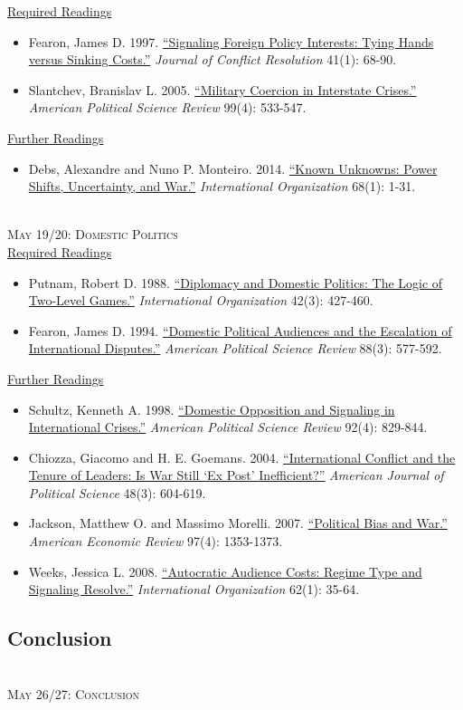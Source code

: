 \documentclass[11pt]{article}
\begin{document}
\noindent \underline{Required Readings}

\begin{itemize}
\item Fearon, James D. 1997. \href{http://jcr.sagepub.com/content/41/1/68.short}{``Signaling Foreign Policy Interests: Tying Hands versus Sinking Costs.''} \textit{Journal of Conflict Resolution} 41(1): 68-90.
\item Slantchev, Branislav L. 2005. \href{http://www.jstor.org/stable/30038963}{``Military Coercion in Interstate Crises.''} \textit{American Political Science Review} 99(4): 533-547.
\end{itemize}

\noindent \underline{Further Readings}

\begin{itemize}
\item Debs, Alexandre and Nuno P. Monteiro. 2014. \href{http://dx.doi.org/10.1017/S0020818313000192}{``Known Unknowns: Power Shifts, Uncertainty, and War.''} \textit{International Organization} 68(1): 1-31.
\end{itemize}

~\\
\noindent \textsc{May 19/20: Domestic Politics} \\

\noindent \underline{Required Readings}

\begin{itemize}
\item Putnam, Robert D. 1988. \href{http://www.jstor.org/stable/2706785}{``Diplomacy and Domestic Politics: The Logic of Two-Level Games.''} \textit{International Organization} 42(3): 427-460.
\item Fearon, James D. 1994. \href{http://www.jstor.org/stable/2944796}{``Domestic Political Audiences and the Escalation of International Disputes.''} \textit{American Political Science Review} 88(3): 577-592.
\end{itemize}

\noindent \underline{Further Readings}

\begin{itemize}
\item Schultz, Kenneth A. 1998. \href{http://www.jstor.org/stable/2586306}{``Domestic Opposition and Signaling in International Crises.''} \textit{American Political Science Review} 92(4): 829-844.
\item Chiozza, Giacomo and H. E. Goemans. 2004. \href{http://www.jstor.org/stable/1519919}{``International Conflict and the Tenure of Leaders: Is War Still `Ex Post' Inefficient?''} \textit{American Journal of Political Science} 48(3): 604-619.
\item Jackson, Matthew O. and Massimo Morelli. 2007. \href{http://www.jstor.org/stable/30034096}{``Political Bias and War.''} \textit{American Economic Review} 97(4): 1353-1373.
\item Weeks, Jessica L. 2008. \href{http://www.jstor.org/stable/40071874}{``Autocratic Audience Costs: Regime Type and Signaling Resolve.''} \textit{International Organization} 62(1): 35-64.
\end{itemize}


\vspace{2mm}
\subsection*{Conclusion}

~\\
\noindent \textsc{May 26/27: Conclusion} \\
\end{document}
